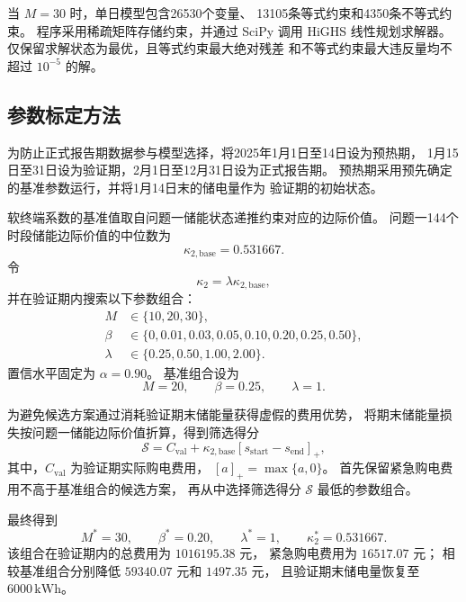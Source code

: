 当 $M=30$ 时，单日模型包含26530个变量、
13105条等式约束和4350条不等式约束。
程序采用稀疏矩阵存储约束，并通过 SciPy 调用 HiGHS
线性规划求解器。仅保留求解状态为最优，且等式约束最大绝对残差
和不等式约束最大违反量均不超过 $10^{-5}$ 的解。

\subsection{参数标定方法}
\label{app:q2_parameter_calibration}

为防止正式报告期数据参与模型选择，将2025年1月1日至14日设为预热期，
1月15日至31日设为验证期，2月1日至12月31日设为正式报告期。
预热期采用预先确定的基准参数运行，并将1月14日末的储电量作为
验证期的初始状态。

软终端系数的基准值取自问题一储能状态递推约束对应的边际价值。
问题一144个时段储能边际价值的中位数为
\begin{equation}
\kappa_{2,\mathrm{base}}=0.531667 .
\label{eq:app_q2_kappa_base}
\end{equation}
令
\begin{equation}
\kappa_2
=
\lambda\kappa_{2,\mathrm{base}},
\label{eq:app_q2_kappa_scaling}
\end{equation}
并在验证期内搜索以下参数组合：
\begin{equation}
\begin{aligned}
M&\in\{10,20,30\},\\
\beta&\in\{0,0.01,0.03,0.05,0.10,0.20,0.25,0.50\},\\
\lambda&\in\{0.25,0.50,1.00,2.00\}.
\end{aligned}
\label{eq:app_q2_parameter_candidates}
\end{equation}
置信水平固定为 $\alpha=0.90$。
基准组合设为
\[
M=20,\qquad \beta=0.25,\qquad \lambda=1.
\]

为避免候选方案通过消耗验证期末储能量获得虚假的费用优势，
将期末储能量损失按问题一储能边际价值折算，得到筛选得分
\begin{equation}
\mathcal S
=
C_{\mathrm{val}}
+
\kappa_{2,\mathrm{base}}
\left[s_{\mathrm{start}}-s_{\mathrm{end}}\right]_+ ,
\label{eq:app_q2_selection_score}
\end{equation}
其中，$C_{\mathrm{val}}$ 为验证期实际购电费用，
$[a]_+=\max\{a,0\}$。
首先保留紧急购电费用不高于基准组合的候选方案，
再从中选择筛选得分 $\mathcal S$ 最低的参数组合。

最终得到
\begin{equation}
M^\ast=30,\qquad
\beta^\ast=0.20,\qquad
\lambda^\ast=1,\qquad
\kappa_2^\ast=0.531667 .
\label{eq:app_q2_selected_parameters}
\end{equation}
该组合在验证期内的总费用为 $1016195.38$ 元，
紧急购电费用为 $16517.07$ 元；
相较基准组合分别降低 $59340.07$ 元和 $1497.35$ 元，
且验证期末储电量恢复至 $6000\,\mathrm{kWh}$。


